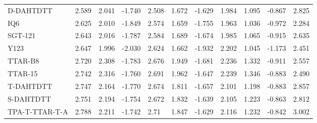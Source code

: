\begin{tabular}{lrrrllllllr}
     D-DAHTDTT &                  2.589 &                       2.041 &                      -1.740 &                 2.508 &                      1.672 &                     -1.629 &               1.984 &                    1.095 &                   -0.867 & 2.825 \\
           IQ6 &                  2.625 &                       2.010 &                      -1.849 &                 2.574 &                      1.659 &                     -1.755 &               1.963 &                    1.036 &                   -0.972 & 2.284 \\
       SGT-121 &                  2.643 &                       2.016 &                      -1.787 &                 2.584 &                      1.689 &                     -1.674 &               1.985 &                    1.065 &                   -0.915 & 2.635 \\
          Y123 &                  2.647 &                       1.996 &                      -2.030 &                 2.624 &                      1.662 &                     -1.932 &               2.202 &                    1.045 &                   -1.173 & 2.451 \\
       TTAR-B8 &                  2.720 &                       2.308 &                      -1.783 &                 2.676 &                      1.949 &                     -1.681 &               2.236 &                    1.332 &                   -0.911 & 2.557 \\
       TTAR-15 &                  2.742 &                       2.316 &                      -1.760 &                 2.691 &                      1.962 &                     -1.647 &               2.239 &                    1.346 &                   -0.883 & 2.490 \\
     T-DAHTDTT &                  2.747 &                       2.164 &                      -1.770 &                 2.674 &                      1.811 &                     -1.657 &               2.101 &                    1.198 &                   -0.883 & 2.857 \\
     S-DAHTDTT &                  2.751 &                       2.194 &                      -1.754 &                 2.672 &                      1.832 &                     -1.639 &               2.105 &                    1.223 &                   -0.863 & 2.812 \\
TPA-T-TTAR-T-A &                  2.788 &                       2.211 &                      -1.742 &                  2.71 &                      1.847 &                     -1.629 &               2.116 &                    1.232 &                   -0.842 & 3.002 \\

\end{tabular}
